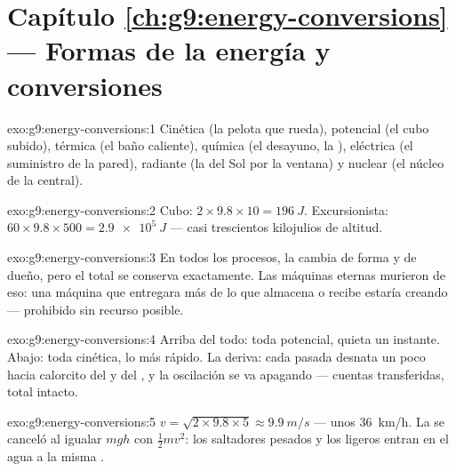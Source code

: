 \section*{Capítulo \ref{ch:g9:energy-conversions} --- Formas de la energía y conversiones}

\begin{solution}{exo:g9:energy-conversions:1}
Cinética (la pelota que rueda), potencial (el cubo subido), térmica (el
baño caliente), química (el desayuno, la ), eléctrica (el
suministro de la pared), radiante (la  del Sol por la ventana) y
nuclear (el núcleo de la central).
\end{solution}

\begin{solution}{exo:g9:energy-conversions:2}
Cubo: $2 \times 9.8 \times 10 = \qty{196}{J}$. Excursionista: $60
\times 9.8 \times 500 = \qty{2.9e5}{J}$ --- casi trescientos kilojulios
de altitud.
\end{solution}

\begin{solution}{exo:g9:energy-conversions:3}
En todos los procesos, la  cambia de forma y de dueño, pero
el total se conserva exactamente. Las máquinas eternas murieron de eso:
una máquina que entregara más de lo que almacena o recibe estaría
creando  --- prohibido sin recurso posible.
\end{solution}

\begin{solution}{exo:g9:energy-conversions:4}
Arriba del todo: toda potencial, quieta un instante. Abajo: toda
cinética, lo más rápido. La deriva: cada pasada desnata un poco hacia
calorcito del  y del , y la oscilación se
va apagando --- cuentas transferidas, total intacto.
\end{solution}

\begin{solution}{exo:g9:energy-conversions:5}
$v = \sqrt{2 \times 9.8 \times 5} \approx \qty{9.9}{m/s}$ --- unos
\qty{36}{km/h}. La  se canceló al igualar $m g h$ con
$\frac12 m v^2$: los saltadores pesados y los ligeros entran en el agua
a la misma .
\end{solution}

